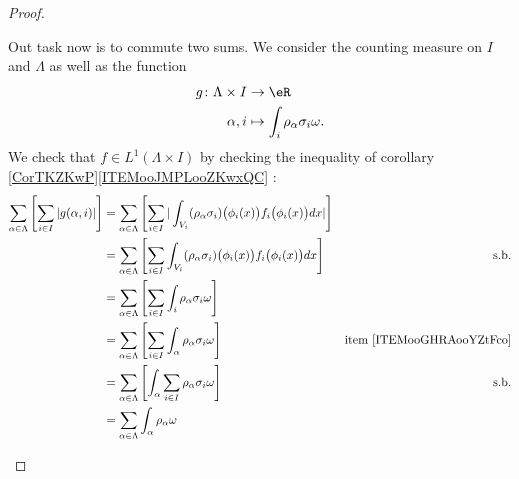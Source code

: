 \begin{proof}
\begin{subproof}
		Out task now is to commute two sums. We consider the counting measure on \( I\) and \( \Lambda\) as well as the function
		\begin{equation}
			\begin{aligned}
				g\colon \Lambda\times I & \to \eR                                    \\
				\alpha,i                & \mapsto \int_i\rho_{\alpha}\sigma_i\omega.
			\end{aligned}
		\end{equation}
		We check that \( f\in L^1(\Lambda\times I)\) by checking the inequality of corollary \ref{CorTKZKwP}\ref{ITEMooJMPLooZKwxQC} :
		\begin{subequations}
			\begin{align}
				\sum_{\alpha\in\Lambda}\left[   \sum_{i\in I} | g(\alpha,i) |  \right] & = \sum_{\alpha\in\Lambda}\left[   \sum_{i\in I}|\int_{V_i}(\rho_{\alpha}\sigma_i)\big( \phi_i(x) \big)f_i\big( \phi_i(x) \big) dx| \right]                                          \\
				                                                                       & = \sum_{\alpha\in\Lambda}\left[   \sum_{i\in I}\int_{V_i}(\rho_{\alpha}\sigma_i)\big( \phi_i(x) \big)f_i\big( \phi_i(x) \big) dx \right]   & \text{s.b.}	\label{SUBEQooXFKGooCNPMNH} \\
				                                                                       & = \sum_{\alpha\in\Lambda}\left[   \sum_{i\in I}\int_i\rho_{\alpha}\sigma_i \omega \right]                                                                                           \\
				                                                                       & = \sum_{\alpha\in\Lambda}\left[   \sum_{i\in I}\int_{\alpha}\rho_{\alpha}\sigma_i \omega  \right]                                          & \text{item \ref{ITEMooGHRAooYZtFco}}   \\
				                                                                       & = \sum_{\alpha\in\Lambda}\left[  \int_{\alpha}\sum_{i\in I}\rho_{\alpha}\sigma_i\omega  \right]                                            & \text{s.b.}		\label{SUBEQooTCEUooWOPPXf} \\
				                                                                       & =\sum_{\alpha\in\Lambda}\int_{\alpha}\rho_{\alpha}\omega                                                                                                                            \\

\end{align}
\end{subequations}
\end{subproof}
\end{proof}
